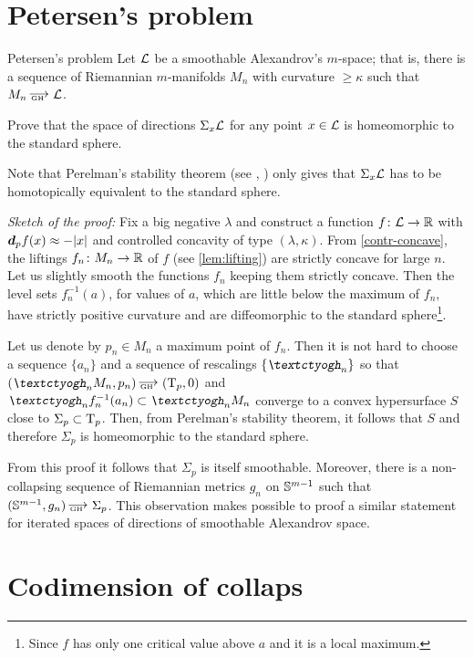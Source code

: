 \section{Petersen's problem} 
\label{app-con-con}

\begin{thm}{Petersen's problem}\label{smoothable}
Let $\mathcal{L}$ be a smoothable Alexandrov's $m$-space; 
that is,
there is a sequence of Riemannian $m$-manifolds $M_n$ with curvature $\ge\kappa$
such that $M_n\GHto \spc{L}$.

Prove that the space of directions $\Sigma_x \mathcal{L}$ for any point $x\in \spc{L}$ is
homeomorphic to the standard sphere.
\end{thm}

Note that Perelman's stability theorem (see  \cite{perelman:spaces2},
\cite{kapovitch:stability}) only gives that $\Sigma_x \mathcal{L}$ has to be homotopically
equivalent to the standard sphere.

\bigskip
\noi\textit{Sketch of the proof:}
Fix a big negative $\lambda$ and construct a function $f\:\spc{L}\to\RR$ with $\d_p
f(x)\approx -|x|$ and controlled concavity of type $(\lambda,\kappa)$.
From  \ref{contr-concave}, the liftings  $f_n\:M_n\to\RR$ of  $f$ (see
\ref{lem:lifting}) are strictly concave for large $n$.
Let us slightly smooth the functions $f_n$ keeping them strictly concave.
Then the level sets $f^{-1}_n(a)$, for values of $a$, which are little below the maximum of $f_n$,
have strictly positive curvature and are diffeomorphic to the standard
sphere\footnote{Since $f$ has only one critical value above $a$ and it is a local maximum.}.

Let us denote by $p_n\in M_n$ a maximum point of $f_n$.
Then it is not hard to choose a sequence $\{a_n\}$ and a sequence of rescalings
$\{\lam_n\}$ so that $(\lam_n M_n,p_n)\GHto (\T_p,0)$ and $\lam_n f^{-1}_n(a_n)\subset \lam_n M_n$ converge to a
convex hypersurface $S$ close to $\Sigma_p\subset \T_p$.
Then, from Perelman's stability theorem, it follows that $S$ and therefore $\Sigma_p$
is homeomorphic to the standard sphere.
\qeds

 From this proof it follows that $\Sigma_p$ is
itself smoothable. 
Moreover, there is a non-collapsing sequence of Riemannian metrics $g_n$ on $\mathbb{S}^{m-1}$ such that $(\SS^{m-1},g_n)\GHto\Sigma_p$. 
This observation makes possible to proof a similar statement for iterated spaces of directions of smoothable Alexandrov space.

\section{Codimension of collaps}

